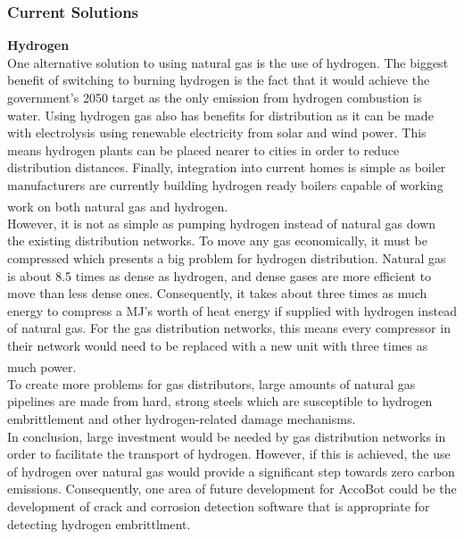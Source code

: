 \documentclass[11pt]{article}		%
\newcommand{\supercite}[1]{\textsuperscript{\cite{#1}}}		%
\begin{document}
            \subsubsection[Current Solutions]{Current Solutions}
            
            \textbf{Hydrogen} \\
            One alternative solution to using natural gas is the use of hydrogen. The biggest benefit of switching to burning hydrogen is the fact that it would achieve the government's 2050 target as the only emission from hydrogen combustion is water. Using hydrogen gas also has benefits for distribution as it can be made with electrolysis using renewable electricity from solar and wind power. This means hydrogen plants can be placed nearer to cities in order to reduce distribution distances. Finally, integration into current homes is simple as boiler manufacturers are currently building hydrogen ready boilers capable of working work on both natural gas and hydrogen\supercite{boilers}.
            \\
            \hspace*{2ex}However, it is not as simple as pumping hydrogen instead of natural gas down the existing distribution networks. To move any gas economically, it must be compressed which presents a big problem for hydrogen distribution. Natural gas is about 8.5 times as dense as hydrogen, and dense gases are more efficient to move than less dense ones. Consequently, it takes about three times as much energy to compress a MJ’s worth of heat energy if supplied with hydrogen instead of natural gas. For the gas distribution networks, this means every compressor in their network would need to be replaced with a new unit with three times as much power\supercite{hydrogendense}.
            \\
            \hspace*{2ex}To create more problems for gas distributors, large amounts of natural gas pipelines are made from hard, strong steels which are susceptible to hydrogen embrittlement and other hydrogen-related damage mechanisms.
            \\
            \hspace*{2ex}In conclusion, large investment would be needed by gas distribution networks in order to facilitate the transport of hydrogen. However, if this is achieved, the use of hydrogen over natural gas would provide a significant step towards zero carbon emissions. Consequently, one area of future development for AccoBot could be the development of crack and corrosion detection software that is appropriate for detecting hydrogen embrittlment. 
            
\end{document}
